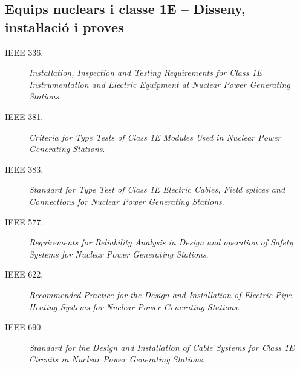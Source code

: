 \subsection*{Equips nuclears i classe 1E -- Disseny, instaŀlació i proves}
\begin{description}
    \item [\hspace{5mm}IEEE 336.] \textit{Installation, Inspection and Testing Requirements for Class 1E Instrumentation and Electric Equipment at Nuclear Power Generating Stations}.
     \item [\hspace{5mm}IEEE 381.] \textit{Criteria for Type Tests of Class 1E Modules Used in Nuclear Power Generating Stations}.
    \item [\hspace{5mm}IEEE 383.] \textit{Standard for Type Test of Class 1E Electric Cables, Field splices and Connections for Nuclear Power Generating Stations}.
    \item [\hspace{5mm}IEEE 577.] \textit{Requirements for Reliability Analysis in Design and operation of Safety Systems for Nuclear Power Generating Stations}.
    \item [\hspace{5mm}IEEE 622.] \textit{Recommended Practice for the Design and Installation of Electric Pipe Heating Systems for Nuclear Power Generating Stations}.
    \item [\hspace{5mm}IEEE 690.] \textit{Standard for the Design and Installation of Cable Systems for Class 1E Circuits in Nuclear Power Generating Stations}.
\end{description}


